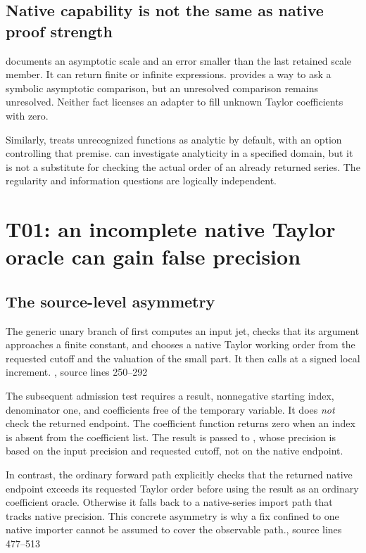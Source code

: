 \documentclass[11pt,letterpaper]{article}
\newcommand{\src}[2]{\cite{#1}, source lines #2}
\theoremstyle{definition}\newtheorem{definition}[proposition]{Definition}
\begin{document}
\subsection{Native capability is not the same as native proof strength}
 documents an asymptotic scale and an error smaller than the
last retained scale member. It can return finite or infinite expressions.
 provides a way to ask a symbolic asymptotic comparison,
but an unresolved comparison remains unresolved. Neither fact licenses an
adapter to fill unknown Taylor coefficients with zero.\cite{wlasymptotic,wlless}

Similarly,  treats unrecognized functions as analytic by default,
with an option controlling that premise.  can investigate
analyticity in a specified domain, but it is not a substitute for checking the
actual order of an already returned series. The regularity and information
questions are logically independent.\cite{wlseries,wlanalytic}

\section{T01: an incomplete native Taylor oracle can gain false precision}
\subsection{The source-level asymmetry}
The generic unary branch of  first computes an input jet,
checks that its argument approaches a finite constant, and chooses a native
Taylor working order from the requested cutoff and the valuation of the small
part. It then calls  at a signed local increment.
\src{operations}{250--292}

The subsequent admission test requires a  result, nonnegative
starting index, denominator one, and coefficients free of the temporary
variable. It does \emph{not} check the returned endpoint. The coefficient
function returns zero when an index is absent from the coefficient list.
The result is passed to , whose precision is based on the
input precision and requested cutoff, not on the native endpoint.
\cite{operations}

In contrast, the ordinary forward  path explicitly checks
that the returned native endpoint exceeds its requested Taylor order before
using the result as an ordinary coefficient oracle. Otherwise it falls back
to a native-series import path that tracks native precision. This concrete
asymmetry is why a fix confined to one native importer cannot be assumed to
cover the observable path.\src{core}{477--513}
\end{document}
